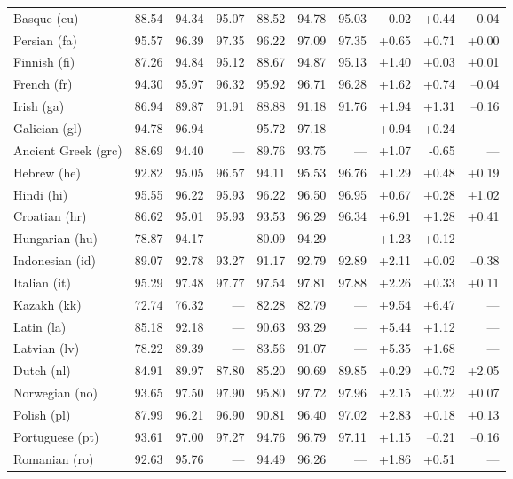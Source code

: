 \documentclass[11pt,letterpaper]{article}
\begin{document}
\begin{table}
\begin{tabular}{l|rrr|rrr|rrr}
Basque (eu) & 88.54 & 94.34 & 95.07 & 88.52 & 94.78 & 95.03 & --0.02 & +0.44 & --0.04\\
Persian (fa) & 95.57 & 96.39 & 97.35 & 96.22 & 97.09 & 97.35 & +0.65 & +0.71 & +0.00\\
Finnish (fi) & 87.26 & 94.84 & 95.12 & 88.67 & 94.87 & 95.13 & +1.40 & +0.03 & +0.01\\
French (fr) & 94.30 & 95.97 & 96.32 & 95.92 & 96.71 & 96.28 & +1.62 & +0.74 & --0.04\\
Irish (ga) & 86.94 & 89.87 & 91.91 & 88.88 & 91.18 & 91.76 & +1.94 & +1.31 & --0.16\\
Galician (gl) & 94.78 & 96.94 & --- & 95.72 & 97.18 & --- & +0.94 & +0.24 & ---\\
Ancient Greek (grc) & 88.69 & 94.40 & --- & 89.76 & 93.75 & --- & +1.07 & -0.65 & ---\\
Hebrew (he) & 92.82 & 95.05 & 96.57 & 94.11 & 95.53 & 96.76 & +1.29 & +0.48 & +0.19\\
Hindi (hi) & 95.55 & 96.22 & 95.93 & 96.22 & 96.50 & 96.95 & +0.67 & +0.28 & +1.02\\
Croatian (hr) & 86.62 & 95.01 & 95.93 & 93.53 & 96.29 & 96.34 & +6.91 & +1.28 & +0.41\\
Hungarian (hu) & 78.87 & 94.17 & --- & 80.09 & 94.29 & --- & +1.23 & +0.12 & ---\\
Indonesian (id) & 89.07 & 92.78 & 93.27 & 91.17 & 92.79 & 92.89 & +2.11 & +0.02 & --0.38\\
Italian (it) & 95.29 & 97.48 & 97.77 & 97.54 & 97.81 & 97.88 & +2.26 & +0.33 & +0.11\\
Kazakh (kk) & 72.74 & 76.32 & --- & 82.28 & 82.79 & --- & +9.54 & +6.47 & ---\\
Latin (la) & 85.18 & 92.18 & --- & 90.63 & 93.29 & --- & +5.44 & +1.12 & ---\\
Latvian (lv) & 78.22 & 89.39 & --- & 83.56 & 91.07 & --- & +5.35 & +1.68 & ---\\
Dutch (nl) & 84.91 & 89.97 & 87.80 & 85.20 & 90.69 & 89.85 & +0.29 & +0.72 & +2.05\\
Norwegian (no) & 93.65 & 97.50 & 97.90 & 95.80 & 97.72 & 97.96 & +2.15 & +0.22 & +0.07\\
Polish (pl) & 87.99 & 96.21 & 96.90 & 90.81 & 96.40 & 97.02 & +2.83 & +0.18 & +0.13\\
Portuguese (pt) & 93.61 & 97.00 & 97.27 & 94.76 & 96.79 & 97.11 & +1.15 & --0.21 & --0.16\\
Romanian (ro) & 92.63 & 95.76 & --- & 94.49 & 96.26 & --- & +1.86 & +0.51 & ---\\

\end{tabular}
\end{table}
\end{document}

